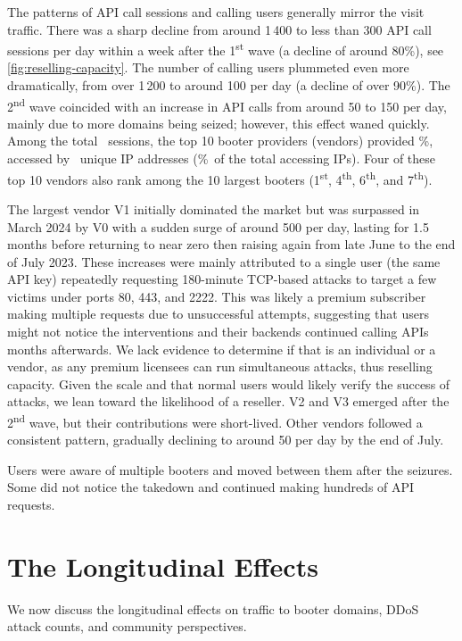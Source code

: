 \documentclass[letterpaper,twocolumn,10pt]{article}
\begin{document}
The patterns of API call sessions and calling users generally mirror the visit traffic. There was a sharp decline from around 1\,400 to less than 300 API call sessions per day within a week after the 1\textsuperscript{st} wave (a decline of around 80\%), see \autoref{fig:reselling-capacity}. The number of calling users plummeted even more dramatically, from over 1\,200 to around 100 per day (a decline of over 90\%). The 2\textsuperscript{nd} wave coincided with an increase in API calls from around 50 to 150 per day, mainly due to more domains being seized; however, this effect waned quickly. Among the total \BTnapicallVisits~sessions, the top 10 booter providers (vendors) provided \BTNApiCallSessionsTopTenProps\%, accessed by \BTNApiCallingUsersTopTen~unique IP addresses (\BTNApiCallingUsersTopTenProps\%~of the total accessing IPs). Four of these top 10 vendors also rank among the 10 largest booters (1\textsuperscript{st}, 4\textsuperscript{th}, 6\textsuperscript{th}, and 7\textsuperscript{th}).

The largest vendor V1 initially dominated the market but was surpassed in March 2024 by V0 with a sudden surge of around 500 per day, lasting for 1.5 months before returning to near zero then raising again from late June to the end of July 2023. These increases were mainly attributed to a single user (the same API key) repeatedly requesting 180-minute TCP-based attacks to target a few victims under ports 80, 443, and 2222. This was likely a premium subscriber making multiple requests due to unsuccessful attempts, suggesting that users might not notice the interventions and their backends continued calling APIs months afterwards. We lack evidence to determine if that is an individual or a vendor, as any premium licensees can run simultaneous attacks, thus reselling capacity. Given the scale and that normal users would likely verify the success of attacks, we lean toward the likelihood of a reseller. V2 and V3 emerged after the 2\textsuperscript{nd} wave, but their contributions were short-lived. Other vendors followed a consistent pattern, gradually declining to around 50 per day by the end of July.

 Users were aware of multiple booters and moved between them after the seizures. Some did not notice the takedown and continued making hundreds of API requests.

\section{The Longitudinal Effects} \label{sec:takedown-effects}
We now discuss the longitudinal effects on traffic to booter domains, DDoS attack counts, and community perspectives.
\end{document}
